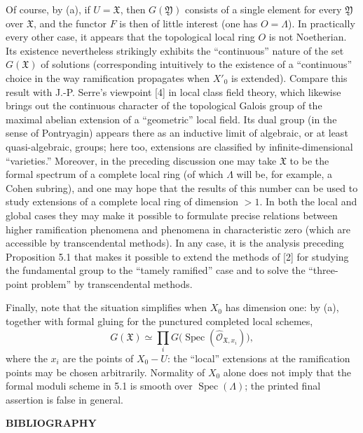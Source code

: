 Of course, by (a), if $U=\mathfrak X$, then $G(\mathfrak Y)$ consists of a
single element for every $\mathfrak Y$ over $\mathfrak X$, and the functor $F$
is then of little interest (one has $O=\Lambda$). In practically every other
case, it appears that the topological local ring $O$ is not Noetherian. Its
existence nevertheless strikingly exhibits the “continuous” nature of the set
$G(\mathfrak X)$ of solutions (corresponding intuitively to the existence of a
“continuous” choice in the way ramification propagates when $X'_0$ is
extended). Compare this result with J.-P. Serre's viewpoint [4] in local class
field theory, which likewise brings out the continuous character of the
topological Galois group of the maximal abelian extension of a “geometric”
local field. Its dual group (in the sense of Pontryagin) appears there as an
inductive limit of algebraic, or at least quasi-algebraic, groups; here too,
extensions are classified by infinite-dimensional “varieties.” Moreover, in
the preceding discussion one may take $\mathfrak X$ to be the formal spectrum
of a complete local ring (of which $\Lambda$ will be, for example, a Cohen
subring), and one may hope that the results of this number can be used to study
extensions of a complete local ring of dimension $>1$. In both the local and
global cases they may make it possible to formulate precise relations between
higher ramification phenomena and phenomena in characteristic zero (which are
accessible by transcendental methods). In any case, it is the analysis
preceding Proposition 5.1 that makes it possible to extend the methods of [2]
for studying the fundamental group to the “tamely ramified” case and to solve
the “three-point problem” by transcendental methods.

Finally, note that the situation simplifies when $X_0$ has dimension one: by (a), together with formal gluing for the punctured completed local schemes,
\[
  G(\mathfrak X)\simeq
  \prod_iG\bigl(\operatorname{Spec}(\widehat{\mathcal O}_{\mathfrak X,x_i})\bigr),
\]
where the $x_i$ are the points of $X_0-U$: the “local” extensions at the
ramification points may be chosen arbitrarily. Normality of $X_0$ alone does not imply that the formal moduli scheme in 5.1 is smooth over $\operatorname{Spec}(\Lambda)$; the printed final assertion is false in general.

\begin{center}
  \textbf{BIBLIOGRAPHY}
\end{center}


